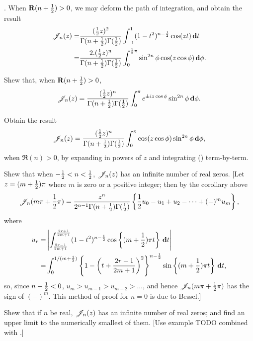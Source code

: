 \documentclass{book}
\begin{document}
\corollary. When $\operatorname{\mathbf{R}}(n+\frac{1}{2}) > 0$, we may deform the path of
integration, and obtain the result
\begin{align*}
  \mathscr{J}_n(z)
  =&
  \frac{ (\frac{1}{2} z)^2 }{ \Gamma(n+\frac{1}{2}) \Gamma(\frac{1}{2}) }
  \int_{-1}^1 (1-t^2)^{n-\frac{1}{2}} \cos(zt) \, \mathbf{d} t
  \\
  =&
  \frac{2 . (\frac{1}{2} z)^n }{ \Gamma(n+\frac{1}{2}) \Gamma(\frac{1}{2}) }
  \int_0^{\frac{1}{2} \pi} \sin^{2n}\phi \cos(z \cos\phi) \, \mathbf{d}\phi.
\end{align*}
\begin{wandwexample}
  Shew that, when $\operatorname{\mathbf{R}}(n+\frac{1}{2}) > 0$,
  $$
  \mathscr{J}_n(z)
  =
  \frac{ (\frac{1}{2} z)^n }{ \Gamma(n+\frac{1}{2}) \Gamma(\frac{1}{2}) }
  \int_0^{\pi} e^{\pm iz\cos\phi} \sin^{2n}\phi \, \mathbf{d}\phi.
  $$
\end{wandwexample}
\begin{wandwexample}
  Obtain the result
  $$
  \mathscr{J}_n(z)
  =
  \frac{ (\frac{1}{2} z)^n }{ \Gamma(n+\frac{1}{2}) \Gamma(\frac{1}{2}) }
  \int_0^{\pi} \cos(z\cos\phi) \sin^{2n}\phi \, \mathbf{d}\phi,
  $$
  when $\Re(n) > 0$, by expanding in powers of $z$ and
  integrating
  () term-by-term.
\end{wandwexample}
% 
% 
\begin{wandwexample}
  Shew that when $-\frac{1}{2} < n < \frac{1}{2}$, $\mathscr{J}_n(z)$ has an infinite number
  of real zeros. [Let $z = (m+\frac{1}{2})\pi$ where $m$ is zero or a
  positive integer; then by the corollary above
  $$
  \mathscr{J}_n(m\pi + \frac{1}{2}\pi)
  =
  \frac{z^n}{2^{n-1} \Gamma(n+\frac{1}{2}) \Gamma(\frac{1}{2})}
  \left\{  \frac{1}{2} u_0 - u_1 + u_2 - \cdots + (-)^m u_m \right\},
  $$
  where
  \begin{align*}
    u_r
    =&
    \left| 
      \int_{\frac{2r-1}{2m+1}}^{\frac{2r+1}{2m+1}}
      (1-t^2)^{n-\frac{1}{2}} \cos \left\{ (m+\frac{1}{2})\pi t \right\}
      \, \mathbf{d} t
     \right|
    \\
    =&
    \int_0^{1/(m+\frac{1}{2})}
    \left\{ 
      1
      -
      \left( t + \frac{2r-1}{2m+1} \right)^2
     \right\}^{n-\frac{1}{2}}
    \sin\left\{  (m+\frac{1}{2})\pi t  \right\}
    \, \mathbf{d} t,
  \end{align*}
  so, since $n - \frac{1}{2} < 0$, $u_m > u_{m-1} > u_{m-2} > \ldots$, and
  hence $\mathscr{J}_n(m\pi + \frac{1}{2}\pi)$ has the sign of $(-)^m$.
  This method of proof for $n=0$ is due to Bessel.]
\end{wandwexample}
\begin{wandwexample}
  Shew that if $n$ be real, $\mathscr{J}_n(z)$ has an infinite number of real
  zeros; and find an upper limit to the numerically smallest of them.
  [Use example TODO combined with .]
\end{wandwexample}
\end{document}
